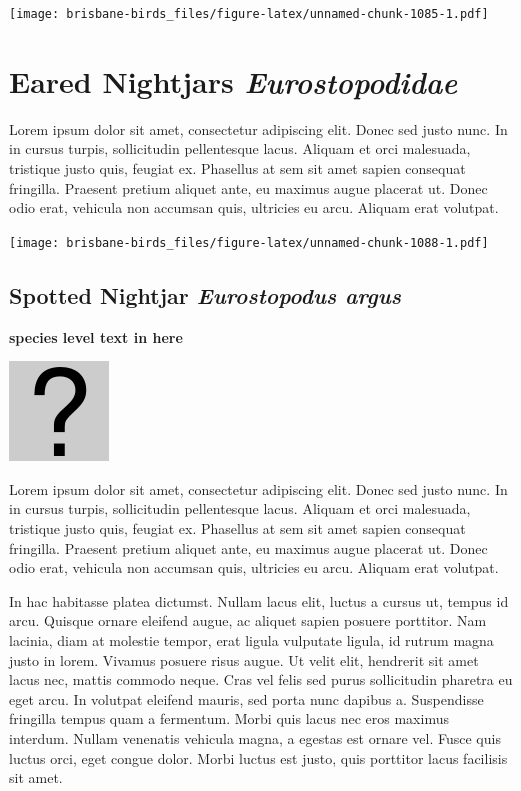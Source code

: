 \documentclass[]{book}
\let\origfigure\figure
\let\endorigfigure\endfigure
\renewenvironment{figure}[1][2] {
  \expandafter\origfigure\expandafter[H]
} {
  \endorigfigure
}
\begin{document}
\begin{figure}
\centering
\texttt{[image: brisbane-birds\_files/figure-latex/unnamed-chunk-1085-1.pdf]}
\caption{\label{fig:unnamed-chunk-1085}insert figure caption}
\end{figure}

\chapter{\texorpdfstring{Eared Nightjars
\emph{Eurostopodidae}}{Eared Nightjars Eurostopodidae}}\label{eared-nightjars-eurostopodidae}

Lorem ipsum dolor sit amet, consectetur adipiscing elit. Donec sed justo
nunc. In in cursus turpis, sollicitudin pellentesque lacus. Aliquam et
orci malesuada, tristique justo quis, feugiat ex. Phasellus at sem sit
amet sapien consequat fringilla. Praesent pretium aliquet ante, eu
maximus augue placerat ut. Donec odio erat, vehicula non accumsan quis,
ultricies eu arcu. Aliquam erat volutpat.

\texttt{[image: brisbane-birds\_files/figure-latex/unnamed-chunk-1088-1.pdf]}

\section{\texorpdfstring{Spotted Nightjar \emph{Eurostopodus
argus}}{Spotted Nightjar Eurostopodus argus}}\label{spotted-nightjar-eurostopodus-argus}

\textbf{species level text in here}

\begin{figure}
\centering
\includegraphics{assets/missing.png}
\caption{No image for species}
\end{figure}

Lorem ipsum dolor sit amet, consectetur adipiscing elit. Donec sed justo
nunc. In in cursus turpis, sollicitudin pellentesque lacus. Aliquam et
orci malesuada, tristique justo quis, feugiat ex. Phasellus at sem sit
amet sapien consequat fringilla. Praesent pretium aliquet ante, eu
maximus augue placerat ut. Donec odio erat, vehicula non accumsan quis,
ultricies eu arcu. Aliquam erat volutpat.

In hac habitasse platea dictumst. Nullam lacus elit, luctus a cursus ut,
tempus id arcu. Quisque ornare eleifend augue, ac aliquet sapien posuere
porttitor. Nam lacinia, diam at molestie tempor, erat ligula vulputate
ligula, id rutrum magna justo in lorem. Vivamus posuere risus augue. Ut
velit elit, hendrerit sit amet lacus nec, mattis commodo neque. Cras vel
felis sed purus sollicitudin pharetra eu eget arcu. In volutpat eleifend
mauris, sed porta nunc dapibus a. Suspendisse fringilla tempus quam a
fermentum. Morbi quis lacus nec eros maximus interdum. Nullam venenatis
vehicula magna, a egestas est ornare vel. Fusce quis luctus orci, eget
congue dolor. Morbi luctus est justo, quis porttitor lacus facilisis sit
amet.
\end{document}
